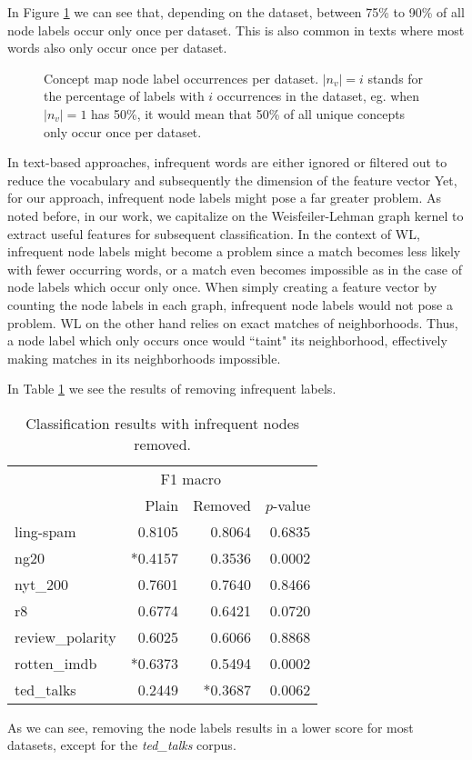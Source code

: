 In Figure \ref{fig:percentage_distribution_concept_occurrences} we can see that, depending on the dataset, between 75\% to 90\% of all node labels occur only once per dataset.
This is also common in texts where most words also only occur once per dataset.
 
\begin{figure}[htb!]
    \caption[Statistics: Distribution concept occurrence]{Concept map node label occurrences per dataset. $|n_v| = i$ stands for the percentage of labels with $i$ occurrences in the dataset, eg. when $|n_v| = 1$ has 50\%, it would mean that 50\% of all unique concepts only occur once per dataset.}\label{fig:percentage_distribution_concept_occurrences}
\end{figure}

In text-based approaches, infrequent words are either ignored or filtered out to reduce the vocabulary and subsequently the dimension of the feature vector
Yet, for our approach, infrequent node labels might pose a far greater problem.
As noted before, in our work, we capitalize on the Weisfeiler-Lehman graph kernel to extract useful features for subsequent classification.
In the context of WL, infrequent node labels might become a problem since a match becomes less likely with fewer occurring words, or a match even becomes impossible as in the case of node labels which occur only once.
When simply creating a feature vector by counting the node labels in each graph, infrequent node labels would not pose a problem.
WL on the other hand relies on exact matches of neighborhoods.
Thus, a node label which only occurs once would ``taint" its neighborhood, effectively making matches in its neighborhoods impossible.

In Table \ref{table:results_infrequent_nodes} we see the results of removing infrequent labels.

\begin{table}[htb!]
    \centering
    \begin{tabular}{lrrr}
\toprule
        &  \multicolumn{2}{c}{F1 macro} &  \\
         &  Plain &  Removed &  $p$-value \\
        \midrule
            ling-spam       & 0.8105 & 0.8064 & 0.6835 \\
            ng20            & *0.4157 & 0.3536 & 0.0002 \\
            nyt\_200         & 0.7601 & 0.7640 & 0.8466 \\
            r8              & 0.6774 & 0.6421 & 0.0720 \\
            review\_polarity & 0.6025 & 0.6066 & 0.8868 \\
            rotten\_imdb     & *0.6373 & 0.5494 & 0.0002 \\
            ted\_talks       & 0.2449 & *0.3687 & 0.0062 \\
        \bottomrule
    \end{tabular}
    \caption[Results: Remove infrequent node labels]{Classification results with infrequent nodes removed.}\label{table:results_infrequent_nodes}
\end{table}

As we can see, removing the node labels results in a lower score for most datasets, except for the \textit{ted\_talks} corpus.

